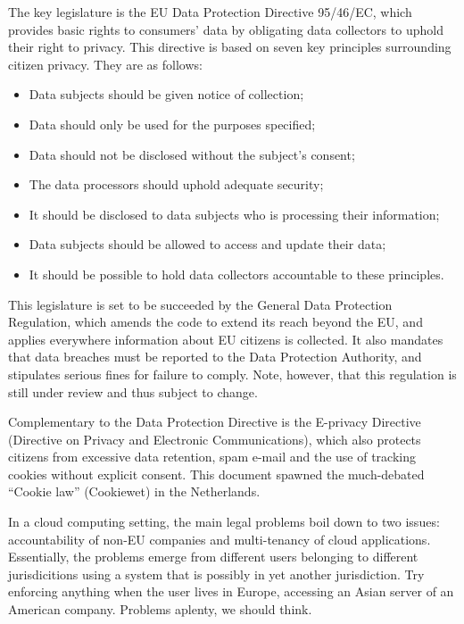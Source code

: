 \documentclass[12pt]{article}
\begin{document}
The key legislature is the EU Data Protection Directive 95/46/EC, which provides basic rights to consumers' data by obligating data collectors to uphold their right to privacy. \cite{directive199595}
This directive is based on seven key principles surrounding citizen privacy.
They are as follows:
\begin{itemize}
\item Data subjects should be given notice of collection;
\item Data should only be used for the purposes specified;
\item Data should not be disclosed without the subject's consent;
\item The data processors should uphold adequate security;
\item It should be disclosed to data subjects who is processing their information;
\item Data subjects should be allowed to access and update their data;
\item It should be possible to hold data collectors accountable to these principles.
\end{itemize}

This legislature is set to be succeeded by the General Data Protection Regulation, which amends the code to extend its reach beyond the EU, and applies everywhere information about EU citizens is collected.
It also mandates that data breaches must be reported to the Data Protection Authority, and stipulates serious fines for failure to comply.
Note, however, that this regulation is still under review and thus subject to change.

Complementary to the Data Protection Directive is the E-privacy Directive (Directive on Privacy and Electronic Communications), which also protects citizens from excessive data retention, spam e-mail and the use of tracking cookies without explicit consent.
This document spawned the much-debated ``Cookie law'' (Cookiewet) in the Netherlands.

In a cloud computing setting, the main legal problems boil down to two issues: accountability of non-EU companies and multi-tenancy of cloud applications. Essentially, the problems emerge from different users belonging to different jurisdicitions using a system that is possibly in yet another jurisdiction. Try enforcing anything when the user lives in Europe, accessing an Asian server of an American company. Problems aplenty, we should think.
\end{document}

